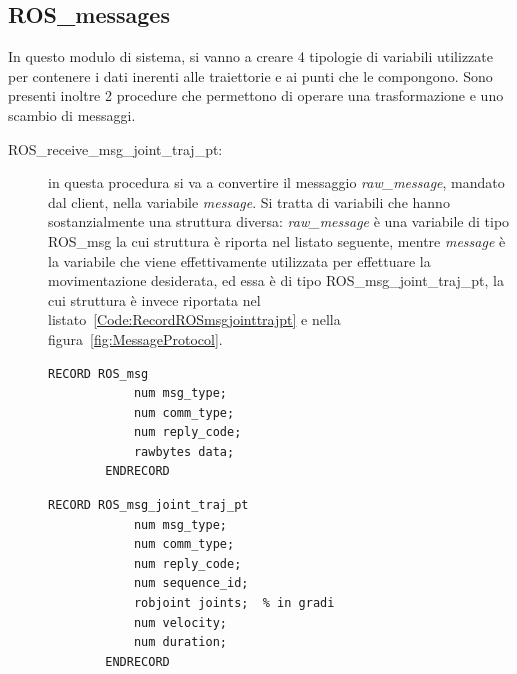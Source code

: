 \subsection{ROS\_messages}
In questo modulo di sistema, si vanno a creare 4 tipologie di variabili utilizzate per contenere i dati inerenti alle traiettorie e ai punti che le compongono. Sono presenti inoltre 2 procedure che permettono di operare una trasformazione e uno scambio di messaggi.
\begin{description}
	\item[ROS\_receive\_msg\_joint\_traj\_pt:] in questa procedura si va a convertire il messaggio \emph{raw\_message}, mandato dal client, nella variabile \emph{message}.
	Si tratta di variabili che hanno sostanzialmente una struttura diversa: \emph{raw\_message} è una variabile di tipo ROS\_msg la cui struttura è riporta nel listato seguente, mentre \emph{message} è la variabile che viene effettivamente utilizzata per effettuare la movimentazione desiderata, ed essa è di tipo ROS\_msg\_joint\_traj\_pt, la cui struttura è invece riportata nel listato~\vref{Code:RecordROSmsgjointtrajpt} e nella figura~\vref{fig:MessageProtocol}.
	\begin{lstlisting}[style=Matlab-editor,caption=Campi caratterizzanti il tipo di variabili ROS-msg,captionpos=b,label={Code:RecordROSmsg}, basicstyle=\scriptsize\ttfamily,frame=trBL]	
		RECORD ROS_msg
			num msg_type;
			num comm_type;
			num reply_code;
			rawbytes data;
		ENDRECORD
	\end{lstlisting}
	\begin{lstlisting}[style=Matlab-editor,caption=Campi caratterizzanti il tipo di variabili ROS-msg-joint-traj-pt,captionpos=b,label={Code:RecordROSmsgjointtrajpt}, basicstyle=\scriptsize\ttfamily,frame=trBL]	
		RECORD ROS_msg_joint_traj_pt
			num msg_type;
			num comm_type;
			num reply_code;
			num sequence_id;
			robjoint joints;  % in gradi
			num velocity;
			num duration;
		ENDRECORD
	\end{lstlisting}
	

\end{description}
